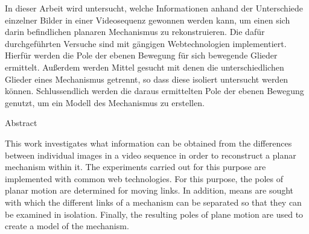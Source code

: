 %
\label{sec:abstract}

In dieser Arbeit wird untersucht, welche Informationen anhand der Unterschiede einzelner Bilder in einer Videosequenz gewonnen werden kann, um einen sich darin befindlichen planaren Mechanismus zu rekonstruieren.
Die dafür durchgeführten Versuche sind mit gängigen Webtechnologien implementiert.
Hierfür werden die Pole der ebenen Bewegung für sich bewegende Glieder ermittelt.
Au{\ss}erdem werden Mittel gesucht mit denen die unterschiedlichen Glieder eines Mechanismus getrennt, so dass diese isoliert untersucht werden können.
Schlussendlich werden die daraus ermittelten Pole der ebenen Bewegung genutzt, um ein Modell des Mechanismus zu erstellen.

\vspace*{20mm}

{Abstract}
\label{sec:abstract-diff}

This work investigates what information can be obtained from the differences between individual images in a video sequence in order to reconstruct a planar mechanism within it.
The experiments carried out for this purpose are implemented with common web technologies.
For this purpose, the poles of planar motion are determined for moving links.
In addition, means are sought with which the different links of a mechanism can be separated so that they can be examined in isolation.
Finally, the resulting poles of plane motion are used to create a model of the mechanism.
